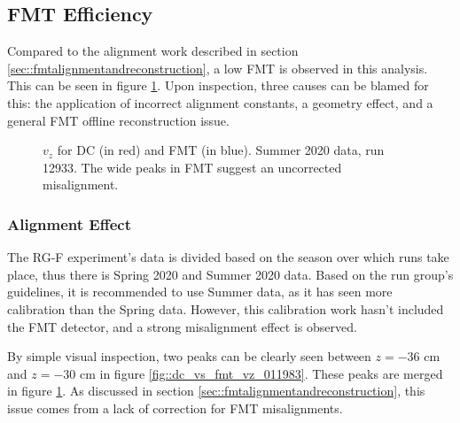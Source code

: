 \subsection{FMT Efficiency}

    Compared to the alignment work described in section \ref{sec::fmtalignmentandreconstruction}, a low FMT is observed in this analysis.
    This can be seen in figure \ref{fig::vz_012933}.
    Upon inspection, three causes can be blamed for this: the application of incorrect alignment constants, a geometry effect, and a general FMT offline reconstruction issue.

    \begin{figure}[b!]
        \centering{}
        \caption[$v_z$ for DC and FMT, run 12933]{$v_z$ for DC (in red) and FMT (in blue). Summer 2020 data, run 12933. The wide peaks in FMT suggest an uncorrected misalignment.}
        \label{fig::vz_012933}
    \end{figure}

    \subsubsection{Alignment Effect}
        The RG-F experiment's data is divided based on the season over which runs take place, thus there is Spring 2020 and Summer 2020 data.
        Based on the run group's guidelines, it is recommended to use Summer data, as it has seen more calibration than the Spring data.
        However, this calibration work hasn't included the FMT detector, and a strong misalignment effect is observed.

        By simple visual inspection, two peaks can be clearly seen between $z = -36$ cm and $z = -30$ cm in figure \ref{fig::dc_vs_fmt_vz_011983}.
        These peaks are merged in figure \ref{fig::vz_012933}.
        As discussed in section \ref{sec::fmtalignmentandreconstruction}, this issue comes from a lack of correction for FMT misalignments.

